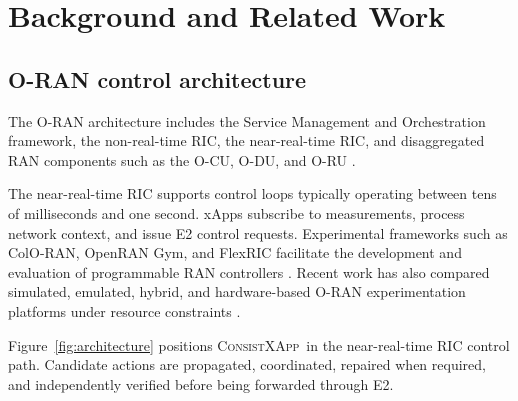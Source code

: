 \documentclass[pdflatex,sn-mathphys-num,iicol,oneside]{sn-jnl}
\newcommand{\method}{\textsc{ConsistXApp}}
\begin{document}
\section{Background and Related Work}
\label{sec:background}

\subsection{O-RAN control architecture}

The O-RAN architecture includes the Service Management and
Orchestration framework, the non-real-time RIC, the near-real-time
RIC, and disaggregated RAN components such as the O-CU, O-DU, and
O-RU \cite{polese2023oran}.

The near-real-time RIC supports control loops typically operating
between tens of milliseconds and one second. xApps subscribe to
measurements, process network context, and issue E2 control requests.
Experimental frameworks such as ColO-RAN, OpenRAN Gym, and FlexRIC
facilitate the development and evaluation of programmable RAN
controllers
\cite{polese2022coloran,bonati2023openrangym,
schmidt2021flexric}. Recent work has also compared simulated,
emulated, hybrid, and hardware-based O-RAN experimentation platforms
under resource constraints \cite{navarro2026demystifying}.

Figure~\ref{fig:architecture} positions \method\ in the
near-real-time RIC control path. Candidate actions are propagated,
coordinated, repaired when required, and independently verified before
being forwarded through E2.
\end{document}
